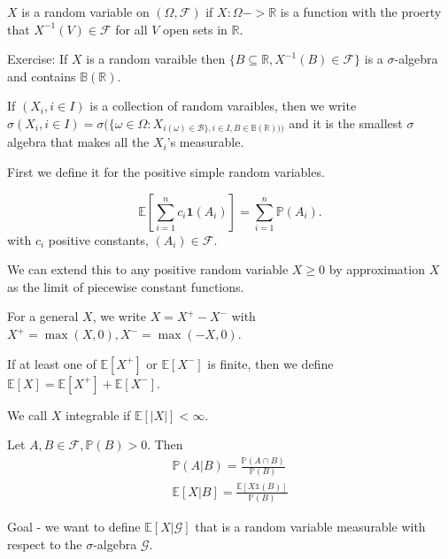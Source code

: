 \begin{defn}
  \label{defn:5}
  $X$ is a random variable on $(\Omega, \mathcal{F})$  if $X: \Omega
  -> \mathbb{R}$ is a function with the proerty that $X^{-1}(V) \in
  \mathcal{F}$ for all $V$ open sets in $\mathbb{R}$.
\end{defn}

Exercise: If $X$ is a random varaible then $\{ B \subseteq \mathbb{R}, X^{-1}(B)
\in \mathcal{F} \}$ is a $\sigma$-algebra and contains
$\mathbb{B}(\mathbb{R})$.

If $(X_{i}, i \in I)$ is a collection of random varaibles, then we
write $\sigma(X_{i}, i \in I) = \sigma(\{ \omega \in \Omega:
X_{i(\omega) \in \mathcal{B} \}, i \in I, B \in
  \mathbb{B}(\mathbb{R}))) }$
and it is the smallest $\sigma$ algebra that makes all the $X_{i}$'s
measurable.

\begin{defn}
  \label{defn:6}
  First we define it for the positive simple random variables.

  \begin{equation}
    \label{eq:2}
    \mathbb{E}[\sum_{i=1}^{n} c_{i} \mathbf{1}(A_{i})] =
    \sum_{i=1}^{n} \mathbb{P}(A_{i}).
  \end{equation}
  with $c_{i}$ positive constants, $(A_{i}) \in \mathcal{F}$.

  We can extend this to any positive random variable $X \geq 0$ by
  approximation $X$ as the limit of piecewise constant functions.

  For a general $X$, we write $X = X^{+} - X^{-}$ with $X^{+}= \max(X,
  0), X^{-} = \max(-X, 0)$.
\end{defn}

If at least one of $\mathbb{E}[X^{+}]$ or $\mathbb{E}[X^{-}]$ is
finite, then we define $\mathbb{E}[X] = \mathbb{E}[X^{+}] +
\mathbb{E}[X^{-}]$.

We call $X$ integrable if $\mathbb{E}[|X|] < \infty$.

\begin{defn}
  \label{defn:7}
  Let $A, B \in \mathcal{F}, \mathbb{P}(B) > 0$. Then
  \begin{align*}
    \mathbb{P}(A | B) = \frac{\mathbb{P}(A \cap B)}{\mathbb{P}(B)} \\
    \mathbb{E}[X | B] = \frac{\mathbb{E}[X \mathbb{1}(B)]}{\mathbb{P}(B)}
  \end{align*}
\end{defn}

Goal - we want to define $\mathbb{E}[X | \mathcal{G}]$ that is a
random variable measurable with respect to the $\sigma$-algebra
$\mathcal{G}$.

